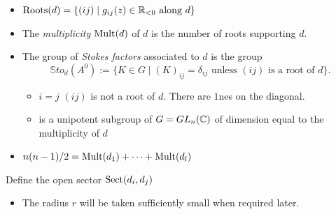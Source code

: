 \begin{defn}
  \begin{itemize}
    \item $\operatorname{Roots}(d)=\{(ij)\mid g_{ij}(z)\in \mathbb{R}_{<0} \text{ along } d \}$
    \item The \emph{multiplicity} $\operatorname{Mult}(d)$ of $d$ is the number of roots
      supporting $d$.
    \item The group of \emph{Stokes factors} associated to $d$ is the group
    \[
      \mathbb{S}to_d(A^0) := \{K \in G \mid (K)_{ij}
        =\delta_{ij} \text{ unless } (ij) \text{ is a root of } d\}.
    \]
    \begin{itemize}
      \item $i=j$ \Rightarrow $(ij)$ is not a root of $d$. There are $1$nes
        on the diagonal.
      \item is a unipotent subgroup of $G=GL_n(\mathbb{C})$ of dimension equal to the
        multiplicity of $d$
    \end{itemize}
    \item $n(n-1)/2=\operatorname{Mult}(d_1)+\dots+\operatorname{Mult}(d_l)$
  \end{itemize}
\end{defn}
\begin{defn}
  Define the open sector $\operatorname{Sect}(d_i,d_j)$
  \begin{center}
  \end{center}
  \begin{itemize}
    \item The radius \textcolor{green!40!black}{$r$} will be taken sufficiently
      small when required later.
  \end{itemize}
\end{defn}
